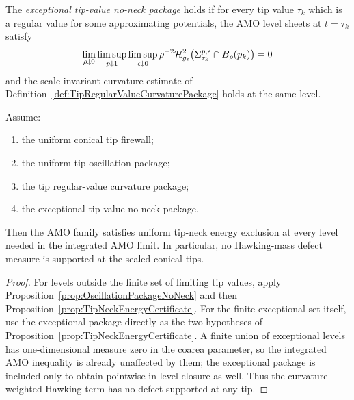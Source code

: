 \begin{definition}
\label{def:ExceptionalTipValueNoNeckPackage}
The \emph{exceptional tip-value no-neck package} holds if for every tip value
\(\tau_k\) which is a regular value for some approximating potentials, the AMO
level sheets at \(t=\tau_k\) satisfy
\[
    \lim_{\rho\downarrow0}
    \limsup_{p\downarrow1}
    \limsup_{\epsilon\downarrow0}
    \rho^{-2}
    \mathcal H^2_{g_{\epsilon}}
    \bigl(\Sigma_{\tau_k}^{p,\epsilon}\cap B_\rho(p_k)\bigr)
    =0
\]
and the scale-invariant curvature estimate of
Definition~\ref{def:TipRegularValueCurvaturePackage} holds at the same level.
\end{definition}

\begin{proposition}
\label{prop:ThreePackageTipNeckClosure}
Assume:
\begin{enumerate}
    \item the uniform conical tip firewall;
    \item the uniform tip oscillation package;
    \item the tip regular-value curvature package;
    \item the exceptional tip-value no-neck package.
\end{enumerate}
Then the AMO family satisfies uniform tip-neck energy exclusion at every level
needed in the integrated AMO limit.  In particular, no Hawking-mass defect
measure is supported at the sealed conical tips.
\end{proposition}

\begin{proof}
For levels outside the finite set of limiting tip values, apply
Proposition~\ref{prop:OscillationPackageNoNeck} and then
Proposition~\ref{prop:TipNeckEnergyCertificate}.  For the finite exceptional
set itself, use the exceptional package directly as the two hypotheses of
Proposition~\ref{prop:TipNeckEnergyCertificate}.  A finite union of exceptional
levels has one-dimensional measure zero in the coarea parameter, so the
integrated AMO inequality is already unaffected by them; the exceptional
package is included only to obtain pointwise-in-level closure as well.  Thus
the curvature-weighted Hawking term has no defect supported at any tip.
\end{proof}

